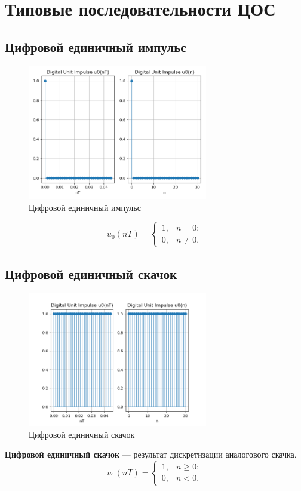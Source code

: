 \documentclass[a4paper, 14pt]{extarticle}
\begin{document}
\section{Типовые последовательности ЦОС}
\subsection{Цифровой единичный импульс}
\begin{figure}[h]
    \centering
    \includegraphics[width=0.7\textwidth]{img/signals/1.png}
    \caption{Цифровой единичный импульс}%
\end{figure}
\begin{equation}
    u_0 (nT) = \begin{cases}
        1, &n = 0;\\
        0, &n \ne 0.
    \end{cases}
\end{equation}

\clearpage
\subsection{Цифровой единичный скачок}
\begin{figure}[h]
    \centering
    \includegraphics[width=0.7\textwidth]{img/signals/2.png}
    \caption{Цифровой единичный скачок}%
\end{figure}
\FloatBarrier{}
\textbf{Цифровой единичный скачок} --- результат дискретизации аналогового скачка.
\begin{equation}
    u_1 (nT) = \begin{cases}
        1, &n \ge 0;\\
        0, &n < 0.
    \end{cases}
\end{equation}
\end{document}
